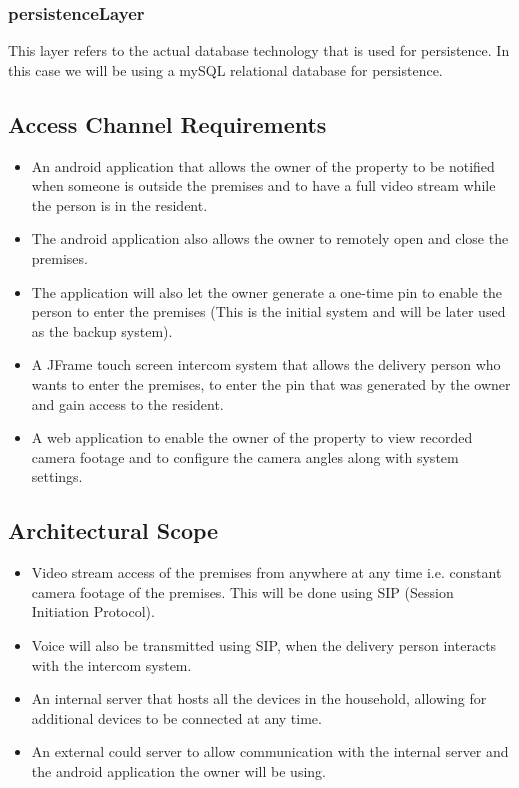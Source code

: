\documentclass[a4paper,12pt]{article}
\begin{document}
	\subsubsection{persistenceLayer}
	This layer refers to the actual database technology that is used for persistence. In this case we will be using a mySQL relational database for persistence.
	
	\subsection{Access Channel Requirements}
	\begin{itemize}
		\item An android application that allows the owner of the property to be notified when someone is outside the premises and to have a full video stream while the person is in the resident.
		
		\item The android application also allows the owner to remotely open and close the premises.
		
		\item The application will also let the owner generate a one-time pin to enable the person to enter the premises (This is the initial system and will be later used as the backup system).  
		
		\item A JFrame touch screen intercom system that allows the delivery person who wants to enter the premises, to enter the pin that was generated by the owner and gain access to the resident.
		
		\item A web application to enable the owner of the property to view recorded camera footage and to configure the camera angles along with system settings. 
	\end{itemize}
	
	\newpage
	\subsection{Architectural Scope}
	\begin{itemize}
		\item Video stream access of the premises from anywhere at any time i.e. constant camera footage of the premises. This will be done using SIP (Session Initiation Protocol).
		
		\item Voice will also be transmitted using SIP, when the delivery person interacts with the intercom system.
		
		\item An internal server that hosts all the devices in the household, allowing for additional devices to be connected at any time. 
		
		\item An external could server to allow communication with the internal server and the android application the owner will be using. 
	\end{itemize}
	
\end{document}
